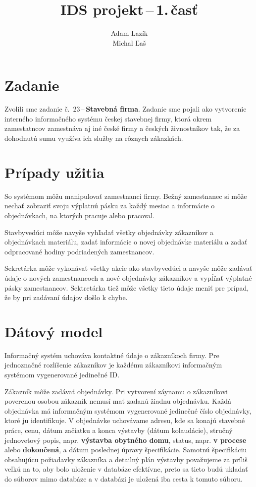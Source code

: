 \documentclass[a4paper]{article}
\title{IDS projekt\,--\,1.\,časť}
\author{Adam Lazík\\
Michal Ľaš}
\begin{document}
\maketitle

\section{Zadanie}

Zvolili sme zadanie č.~23\,--\,\textbf{Stavebná firma}.
Zadanie sme pojali ako vytvorenie interného informačného systému českej stavebnej firmy, ktorá okrem zamestatncov zamestnáva aj iné české firmy a českých živnostníkov tak, že za dohodnutú sumu využíva ich služby na rôznych zákazkách.

\section{Prípady užitia}

So systémom môžu manipulovať zamestnanci firmy.
Bežný zamestnanec si môže nechať zobraziť svoju výplatnú pásku za každý mesiac a informácie o objednávkach, na ktorých pracuje alebo pracoval.

Stavbyvedúci môže navyše vyhľadať všetky objednávky zákazníkov a objednávkach materiálu, zadať informácie o novej objednávke materiálu a zadať odpracované hodiny podriadených zamestnancov.

Sekretárka môže vykonávať všetky akcie ako stavbyvedúci a navyše môže zadávať údaje o nových zamestnancoch a nové objednávky zákazníkov a vypĺňať výplatné pásky zamestnancov.
Sektretárka tiež môže všetky tieto údaje meniť pre prípad, že by pri zadávaní údajov došlo k chybe.

\section{Dátový model}

Informačný systém uchováva kontaktné údaje o zákazníkoch firmy.
Pre jednoznačné rozlíšenie zákazníkov je každému zákazníkovi informačným systémom vygenerované jedinečné ID.\@

Zákazník môže zadávať objednávky.
Pri vytvorení záynamu o zákazníkovi poverenou osobou zákazník nemusí mať zadanú žiadnu objednávku.
Každá objednávka má informačným systémom vygenerované jedinečné číslo objednávky, ktoré ju identifikuje.
V objednávke uchovávame adresu, kde sa konajú stavebné práce, cenu, dátum začiatku a konca výstavby (dátum kolaudácie), stručný jednovetový popis, napr. \textbf{výstavba obytného domu}, status, napr. \textbf{v procese} alebo \textbf{dokončená}, a dátum poslednej úpravy špecifikácie.
Samotnú špecifikáciu obsahujúcu požiadavky zákazníka a detailný plán výstavby považujeme za príliš veľkú na to, aby bolo uloženie v databáze efektívne, preto sa tieto budú ukladať do súborov mimo databáze a v databázi je uložená iba  cesta k tomuto súboru.\@
\end{document}
